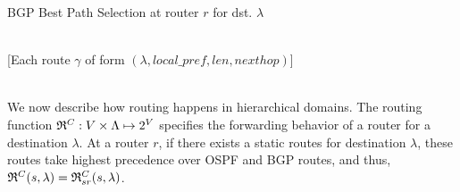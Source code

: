 \begin{algorithm} [t]
	\begin{footnotesize} 
		\caption{BGP Best Path Selection at router $r$ for dst. $\lambda$}
		\label{alg:bgppathrules}
		\begin{multicols}{2}
		\begin{algorithmic}[1]
			\vspace*{-0.75cm}
			 \\
			\hspace*{0.4cm} [Each route $\gamma$ of form $(\lambda, local\_pref, len, nexthop)$]
			\\
			\Else \newline
			\hspace*{0.7cm}
			\EndIf
			\EndIf
			\Else \\
			\hspace*{0.7cm}
			\EndIf
			\EndProcedure
		\end{algorithmic}
		 \end{multicols}
	\end{footnotesize}
\end{algorithm}


 We now describe how routing
happens in hierarchical domains. The routing function 
$\mathfrak{R}^C: V \times \Lambda \mapsto 2^V$ specifies the forwarding
behavior of a router for a destination $\lambda$. 
At a router $r$, if there exists a static routes for destination $\lambda$,
these routes take highest precedence over OSPF and BGP routes, 
and thus, $\mathfrak{R}^C(s, \lambda) = \mathfrak{R}_{sr}^C(s, \lambda)$.

